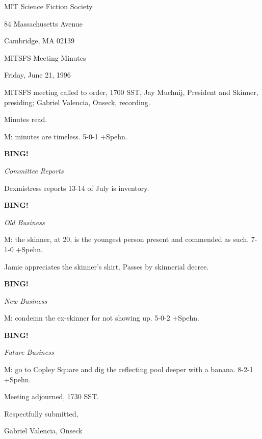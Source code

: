 \documentclass[12pt]{article}
\newcommand{\bing}{{\bf BING!} }
\newcommand{\goto}[1]{\bing \vskip 12pt \centerline{{\em{#1}}}}
\begin{document}
\begin{center}

MIT Science Fiction Society 

84 Massachusetts Avenue

Cambridge, MA 02139

\vspace{12pt}

MITSFS Meeting Minutes 

Friday, June 21, 1996

\end{center}
 
\vspace{18pt}

\setlength{\parskip}{6pt}

\noindent
MITSFS meeting called to order, 1700 SST,
Jay Muchnij, President and Skinner, presiding; Gabriel Valencia, Onseck, recording.

Minutes read.

M: minutes are timeless. 5-0-1 +Spehn.

\goto{Committee Reports}

Dexmistress reports 13-14 of July is inventory.

\goto{Old Business}

M: the skinner, at 20, is the youngest person present and commended as such. 7-1-0 +Spehn.

Jamie appreciates the skinner's shirt. Passes by skinnerial decree.

\goto{New Business}

M: condemn the ex-skinner for not showing up. 5-0-2 +Spehn.

\goto{Future Business}

M: go to Copley Square and dig the reflecting pool deeper with a banana. 8-2-1 +Spehn.

\vspace{12pt}

\noindent
Meeting adjourned, 1730 SST.

\vspace{18pt}

\centerline{Respectfully submitted,}
\centerline{Gabriel Valencia, Onseck}
\end{document}
